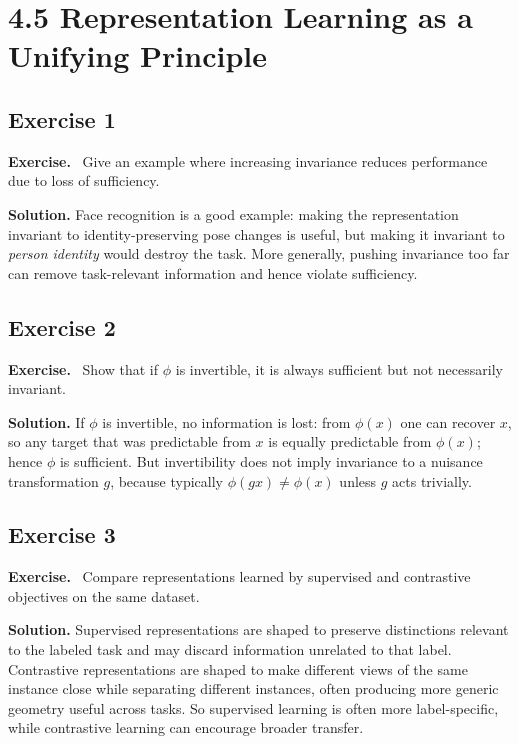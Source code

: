 \documentclass[11pt]{article}
\newenvironment{exercisebox}{\begin{framed}\noindent\textbf{Exercise.}\ }{\end{framed}}
\begin{document}
\section{4.5 Representation Learning as a Unifying Principle}
\subsection*{Exercise 1}
\begin{exercisebox}
Give an example where increasing invariance reduces performance due to loss of sufficiency.
\end{exercisebox}
\textbf{Solution.} Face recognition is a good example: making the representation invariant to identity-preserving pose changes is useful, but making it invariant to \emph{person identity} would destroy the task. More generally, pushing invariance too far can remove task-relevant information and hence violate sufficiency.

\subsection*{Exercise 2}
\begin{exercisebox}
Show that if $\phi$ is invertible, it is always sufficient but not necessarily invariant.
\end{exercisebox}
\textbf{Solution.} If $\phi$ is invertible, no information is lost: from $\phi(x)$ one can recover $x$, so any target that was predictable from $x$ is equally predictable from $\phi(x)$; hence $\phi$ is sufficient. But invertibility does not imply invariance to a nuisance transformation $g$, because typically $\phi(gx)\neq \phi(x)$ unless $g$ acts trivially.

\subsection*{Exercise 3}
\begin{exercisebox}
Compare representations learned by supervised and contrastive objectives on the same dataset.
\end{exercisebox}
\textbf{Solution.} Supervised representations are shaped to preserve distinctions relevant to the labeled task and may discard information unrelated to that label. Contrastive representations are shaped to make different views of the same instance close while separating different instances, often producing more generic geometry useful across tasks. So supervised learning is often more label-specific, while contrastive learning can encourage broader transfer.
\end{document}
